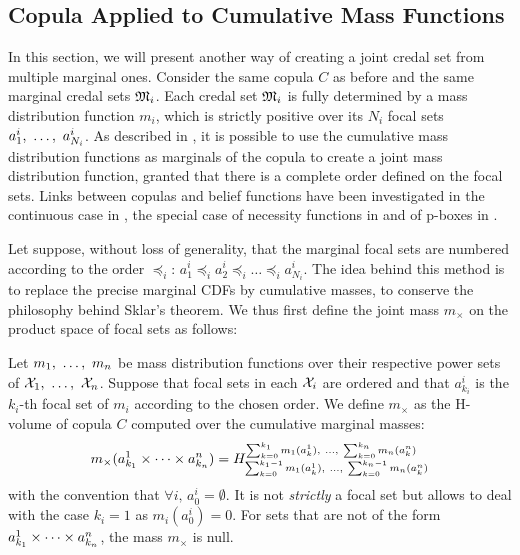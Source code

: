 \subsection{Copula Applied to Cumulative Mass Functions}\label{sec:joint_mass}
In this section, we will present another way of creating a joint credal set from multiple marginal ones. Consider the same copula $C$ as before and the same marginal credal sets $\mathfrak{M}_i$. Each credal set $\mathfrak{M}_i$ is fully determined by a mass distribution function $m_i$, which is strictly positive over its $N_i$ focal sets $a^i_1 , ~\dots, ~ a^i_{N_i}$. As described in \cite{ferson_dependence_2004}, it is possible to use the cumulative mass distribution functions as marginals of the copula to create a joint mass distribution function, granted that there is a complete order defined on the focal sets. Links between copulas and belief functions have been investigated in the continuous case in \cite{schmelzer_joint_2015, schmelzer_multivariate_2019}, the special case of necessity functions in \cite{schmelzer_sklars_2015} and of p-boxes in \cite{schmelzer_random_2023}.

Let suppose, without loss of generality, that the marginal focal sets are numbered according to the order $\preceq_i$: $a^i_1\preceq_ia^i_2\preceq_i\dots\preceq_i a^i_{N_i}$. The idea behind this method is to replace the precise marginal CDFs by cumulative masses, to conserve the philosophy behind Sklar's theorem. We thus first define the joint mass $m_\times$ on the product space of focal sets as follows:

\begin{definition}\label{def:joint_mass}
    Let $m_1 , ~\dots, ~ m_n$ be mass distribution functions over their respective power sets of $\mathcal{X}_1 , ~\dots, ~ \mathcal{X}_n$. Suppose that focal sets in each $\mathcal{X}_i$ are ordered and that $a_{k_i}^i$ is the $k_i$-th focal set of $m_i$ according to the chosen order. We define $m_\times$ as the H-volume of copula $C$ computed over the cumulative marginal masses:
    \begin{eqnarray}\label{eq:joint_mass}
        m_\times(a^1_{k_1}\times\dots\times a^n_{k_n}) = H_{\sum_{k=0}^{k_1-1}m_1(a^1_k) , ~\dots, ~ \sum_{k=0}^{k_n-1}m_n(a^n_k)}^{\sum_{k=0}^{k_1}m_1(a^1_k) , ~\dots, ~ \sum_{k=0}^{k_n}m_n(a^n_k)}
    \end{eqnarray}
    with the convention that $\forall i,\, a^i_0=\emptyset$. It is not \textit{strictly} a focal set but allows to deal with the case $k_i=1$ as $m_i(a^i_0)=0$. For sets that are not of the form $a^1_{k_1}\times\dots\times a^n_{k_n}$, the mass $m_\times$ is null.
\end{definition}

